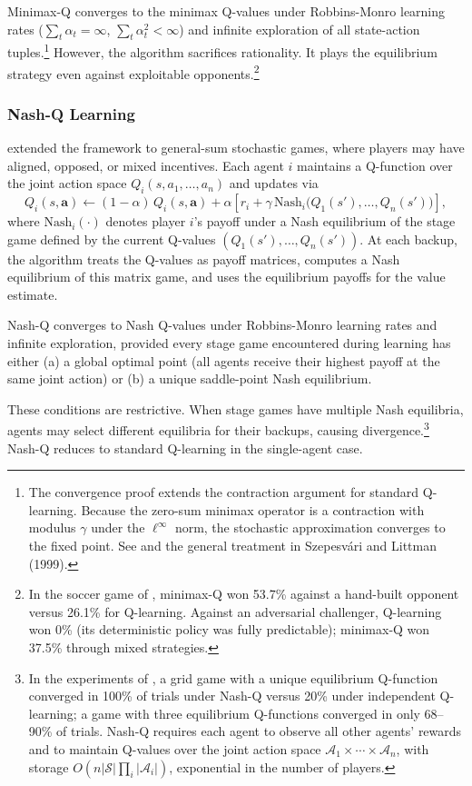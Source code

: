 Minimax-Q converges to the minimax Q-values under Robbins-Monro learning rates ($\sum_t \alpha_t = \infty$, $\sum_t \alpha_t^2 < \infty$) and infinite exploration of all state-action tuples.\footnote{The convergence proof extends the contraction argument for standard Q-learning. Because the zero-sum minimax operator is a contraction with modulus $\gamma$ under the $\ell^\infty$ norm, the stochastic approximation converges to the fixed point. See \citet{littman1994markov} and the general treatment in Szepesvári and Littman (1999).} However, the algorithm sacrifices rationality. It plays the equilibrium strategy even against exploitable opponents.\footnote{In the soccer game of \citet{littman1994markov}, minimax-Q won 53.7\% against a hand-built opponent versus 26.1\% for Q-learning. Against an adversarial challenger, Q-learning won 0\% (its deterministic policy was fully predictable); minimax-Q won 37.5\% through mixed strategies.}

\subsubsection{Nash-Q Learning}

\citet{hu2003nash} extended the framework to general-sum stochastic games, where players may have aligned, opposed, or mixed incentives. Each agent $i$ maintains a Q-function over the joint action space $Q_i(s, a_1, \ldots, a_n)$ and updates via
\begin{equation}
Q_i(s, \mathbf{a}) \leftarrow (1-\alpha)\, Q_i(s, \mathbf{a}) + \alpha\left[r_i + \gamma\, \text{Nash}_i\bigl(Q_1(s'), \ldots, Q_n(s')\bigr)\right],
\end{equation}
where $\text{Nash}_i(\cdot)$ denotes player $i$'s payoff under a Nash equilibrium of the stage game defined by the current Q-values $(Q_1(s'), \ldots, Q_n(s'))$. At each backup, the algorithm treats the Q-values as payoff matrices, computes a Nash equilibrium of this matrix game, and uses the equilibrium payoffs for the value estimate.

\begin{theorem}
Nash-Q converges to Nash Q-values under Robbins-Monro learning rates and infinite exploration, provided every stage game encountered during learning has either (a) a global optimal point (all agents receive their highest payoff at the same joint action) or (b) a unique saddle-point Nash equilibrium.
\end{theorem}

These conditions are restrictive. When stage games have multiple Nash equilibria, agents may select different equilibria for their backups, causing divergence.\footnote{In the experiments of \citet{hu2003nash}, a grid game with a unique equilibrium Q-function converged in 100\% of trials under Nash-Q versus 20\% under independent Q-learning; a game with three equilibrium Q-functions converged in only 68--90\% of trials. Nash-Q requires each agent to observe all other agents' rewards and to maintain Q-values over the joint action space $\mathcal{A}_1 \times \cdots \times \mathcal{A}_n$, with storage $O(n |\mathcal{S}| \prod_i |\mathcal{A}_i|)$, exponential in the number of players.} Nash-Q reduces to standard Q-learning in the single-agent case.

